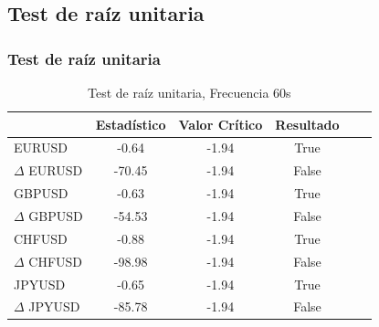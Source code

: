\documentclass{beamer}
\begin{document}
        \subsection{Test de raíz unitaria}
            \begin{frame}
            \frametitle{Test de raíz unitaria}
            \begin{table}[h!]
            \caption{Test de raíz unitaria, Frecuencia 60s}
            \label{tab:adf_60s}
            \begin{center}
            \begin{tabular}{|l|c|c|c|c|c|}
            \hline
            & \textbf{Estadístico} & \textbf{Valor Crítico} & \textbf{Resultado}\\
            \hline
            EURUSD          & -0.64 & -1.94 & True       \\
            $\Delta$ EURUSD & -70.45   & -1.94 & False       \\
            GBPUSD          & -0.63   & -1.94 & True          \\
            $\Delta$ GBPUSD & -54.53   & -1.94 & False       \\
            CHFUSD          & -0.88   & -1.94 & True         \\
            $\Delta$ CHFUSD & -98.98   & -1.94 & False       \\
            JPYUSD          & -0.65 & -1.94 & True        \\
            $\Delta$ JPYUSD & -85.78 & -1.94 & False     \\
            \hline
            \end{tabular}
            \end{center}
            \end{table}

            \end{frame}
\end{document}
